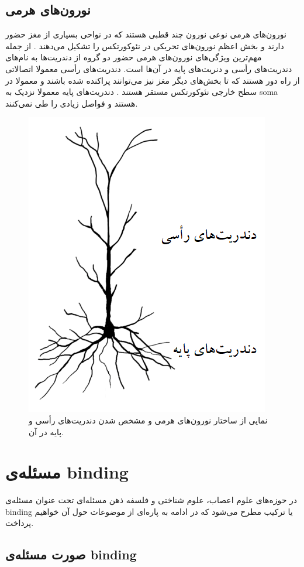 \documentclass[12pt]{report}
\begin{document}
	
	\subsection{نورون‌های هرمی}
	
	نورون‌های هرمی نوعی نورون چند قطبی هستند که در نواحی بسیاری از مغز حضور دارند و بخش اعظم نورون‌های تحریکی در نئوکورتکس را تشکیل می‌دهند \cite{Hawkins2016}.
	از جمله مهم‌ترین ویژگی‌های نورون‌های هرمی حضور دو گروه از دندریت‌ها به نام‌های دندریت‌های رأسی و دنریت‌های پایه در آن‌ها است.
	دندریت‌های رأسی معمولا اتصالاتی از راه دور هستند که تا بخش‌های دیگر مغز نیز می‌توانند پراکنده شده باشند و معمولا در سطح خارجی نئوکورتکس مستقر هستند \cite{MEGIAS2001527}. دندریت‌‌های پایه معمولا نزدیک به \gls{soma} هستند و فواصل زیادی را طی نمی‌کنند.
	
	\begin{figure}[H]
		\centering
		\includegraphics[width=0.5\linewidth]{pyramidal.png}
		\caption[NS]{
			نمایی از ساختار نورون‌های هرمی و مشخص شدن دندریت‌های رأسی و پایه در آن.
		}
		\label{fig:pyramidal}
	\end{figure}
	
	\section{مسئله‌ی \gls{binding}}
	
	در حوزه‌های علوم اعصاب، علوم شناختی و فلسفه ذهن مسئله‌ای تحت عنوان مسئله‌ی \gls{binding}
	یا ترکیب 
	مطرح می‌شود که در ادامه به پاره‌ای از موضوعات حول آن خواهیم پرداخت.
	
	\subsection{صورت مسئله‌ی \gls{binding}}
	
\end{document}
